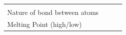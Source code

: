 \begin{enumerate}[noitemsep, label=\textbf{\arabic*}. ]
{\begin{tabular}[t]{|l|l|l|l|}
         &
    
    
     \tabularnewline\cline{1-1}\cline{2-2}\cline{3-3}\cline{4-4}
    
    
        Nature of bond between atoms &
    
    
         &
    
    
         &
    
    
     \tabularnewline\cline{1-1}\cline{2-2}\cline{3-3}\cline{4-4}
    
    
        Melting Point (high/low) &
    
    
         &
    
    

\end{tabular}}
\end{enumerate}
